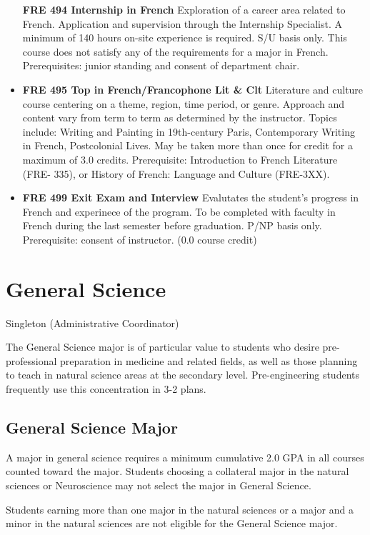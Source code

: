 \documentclass[
  letterpaper,
]{scrbook}
\begin{document}
\begin{itemize}
  \textbf{FRE 494 Internship in French} Exploration of a career area
  related to French. Application and supervision through the Internship
  Specialist. A minimum of 140 hours on-site experience is required. S/U
  basis only. This course does not satisfy any of the requirements for a
  major in French. Prerequisites: junior standing and consent of
  department chair.
\item
  \textbf{FRE 495 Top in French/Francophone Lit \& Clt} Literature and
  culture course centering on a theme, region, time period, or genre.
  Approach and content vary from term to term as determined by the
  instructor. Topics include: Writing and Painting in 19th-century
  Paris, Contemporary Writing in French, Postcolonial Lives. May be
  taken more than once for credit for a maximum of 3.0 credits.
  Prerequisite: Introduction to French Literature (FRE- 335), or History
  of French: Language and Culture (FRE-3XX).
\item
  \textbf{FRE 499 Exit Exam and Interview} Evalutates the student's
  progress in French and experinece of the program. To be completed with
  faculty in French during the last semester before graduation. P/NP
  basis only. Prerequisite: consent of instructor. (0.0 course credit)
\end{itemize}

\section{General Science}\label{sec-general-science}

Singleton (Administrative Coordinator)

The General Science major is of particular value to students who desire
pre-professional preparation in medicine and related fields, as well as
those planning to teach in natural science areas at the secondary level.
Pre-engineering students frequently use this concentration in 3-2 plans.

\subsection{General Science Major}\label{general-science-major}

A major in general science requires a minimum cumulative 2.0 GPA in all
courses counted toward the major. Students choosing a collateral major
in the natural sciences or Neuroscience may not select the major in
General Science.

Students earning more than one major in the natural sciences or a major
and a minor in the natural sciences are not eligible for the General
Science major.
\end{document}

